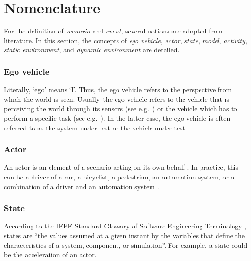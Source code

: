 \section{Nomenclature}
\label{sec:nomenclature}

For the definition of \emph{scenario} and \emph{event}, several notions are adopted from literature. In this section, the concepts of \emph{ego vehicle}, \emph{actor}, \emph{state}, \emph{model}, \emph{activity}, \emph{static environment}, and \emph{dynamic environment} are detailed. 

\subsubsection{Ego vehicle}
\label{sec:ego vehicle}
Literally, `ego' means `I'. Thus, the ego vehicle refers to the perspective from which the world is seen. Usually, the ego vehicle refers to the vehicle that is perceiving the world through its sensors (see e.g.~\cite{Bonnin2014}) or the vehicle which has to perform a specific task (see e.g.~\cite{althoff2017CommonRoad}). In the latter case, the ego vehicle is often referred to as the system under test \cite{stellet2015taxonomy} or the vehicle under test \cite{gietelink2006development}.

\subsubsection{Actor}
\label{sec:actor}
An actor is an element of a scenario acting on its own behalf \cite{ulbrich2015}. In practice, this can be a driver of a car, a bicyclist, a pedestrian, an automation system, or a combination of a driver and an automation system \cite{geyer2014}.

\subsubsection{State}
\label{sec:state}
According to the IEEE Standard Glossary of Software Engineering Terminology \cite{ieee1990glossary}, states are ``the values assumed at a given instant by the variables that define the characteristics of a system, component, or simulation''. For example, a state could be the acceleration of an actor.

